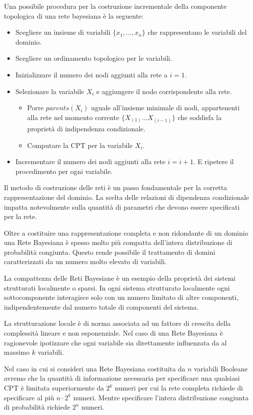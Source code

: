 Una possibile procedura per la costruzione incrementale della componente topologica
di una rete bayesiana è la seguente:
\begin{itemize}
    \item Scegliere un insieme di variabili $\{x_1, \dots, x_n\}$ che rappresentano
          le variabili del dominio.
    \item Scegliere un ordinamento topologico per le variabili.
    \item Inizializzare il numero dei nodi aggiunti alla rete a $i=1$.
    \item Selezionare la variabile $X_i$ e aggiungere il nodo corrispondente alla
          rete.
          \begin{itemize}
              \item Porre $parents(X_i)$ uguale all'insieme minimale di nodi,
                    appartenenti alla rete nel momento corrente $\{X_{(1)} \dots X_{(i-1)}\}$
                    che soddisfa la proprietà di indipendenza condizionale.
              \item Computare la CPT per la variabile $X_i$.
          \end{itemize}
    \item Incrementare il numero dei nodi aggiunti alla rete $i=i+1$. E ripetere il
          procedimento per ogni variabile.
\end{itemize}
Il metodo di costruzione delle reti è un passo fondamentale per la corretta
rappresentazione del dominio. La scelta delle relazioni di dipendenza condizionale
impatta notevolmente sulla quantità di parametri che devono essere specificati
per la rete.

Oltre a costituire una rappresentazione completa e non ridondante di un dominio
una Rete Bayesiana è spesso molto più compatta dell'intera distribuzione di
probabilità congiunta. Questo rende possibile il trattamento di domini
caratterizzati da un numero molto elevato di variabili.

La compattezza delle Reti Bayesiane è un esempio della proprietà dei sistemi
strutturati localmente o sparsi. In ogni sistema strutturato localmente ogni
sottocomponente interagisce solo con un numero limitato di altre componenti,
indipendentemente dal numero totale di componenti del sistema.

La strutturazione locale è di norma associata ad un fattore di crescita della
complessità lineare e non esponenziale. Nel caso di una Rete Bayesiana è ragionevole
ipotizzare che ogni variabile sia direttamente influenzata da al massimo $k$
variabili.

Nel caso in cui si consideri una Rete Bayesiana costituita da $n$ variabili
Booleane avremo che la quantità di informazione necessaria per specificare una
qualsiasi CPT è limitata superiormente da $2^k$ numeri per cui la rete completa
richiede di specificare al più $n \cdot 2^k$ numeri. Mentre specificare l'intera
distribuzione congiunta di probabilità richiede $2^n$ numeri.
